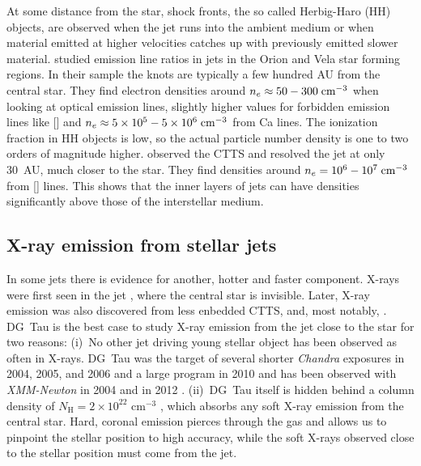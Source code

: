 \documentclass{emulateapj}
\begin{document}
At some distance from the star, shock fronts, the so called Herbig-Haro (HH) objects, are observed when the jet runs into the ambient medium or when material emitted at higher velocities catches up with previously emitted slower material. \citet{2006A&A...456..189P} studied emission line ratios in jets in the Orion and Vela star forming regions. In their sample the knots are typically a few hundred AU from the central star. They find electron densities around $n_e \approx 50-300 \textrm{\;cm}^{-3}$ when looking at optical emission lines, slightly higher values for forbidden emission lines like [] and $n_e \approx 5\times10^5-5\times10^6 \textrm{\;cm}^{-3}$ from Ca lines. The ionization fraction in HH objects is low, so the actual particle number density is one to two orders of magnitude higher. \citet{2004ApJ...609..261H} observed the CTTS  and resolved the jet at only 30~AU, much closer to the star. They find densities around $n_e=10^6-10^7\textrm{\;cm}^{-3}$ from [] lines. This shows that the inner layers of jets can have densities significantly above those of the interstellar medium.

\subsection{X-ray emission from stellar jets}
\label{sect:introxray}
In some jets there is evidence for another, hotter and faster component. X-rays were first seen in the jet  \citep{2001Natur.413..708P,2012A&A...542A.123S}, where the central star is invisible. Later, X-ray emission was also discovered from less enbedded CTTS,  \citep{2014ApJ...788..101S} and, most notably, . DG~Tau is the best case to study X-ray emission from the jet close to the star for two reasons: (i)~No other jet driving young stellar object has been observed as often in X-rays. DG~Tau was the target of several shorter \emph{Chandra} exposures in 2004, 2005, and 2006 and a large program in 2010 \citep{2005ApJ...626L..53G,2008A&A...478..797G,2011ASPC..448..617G} and has been observed with \emph{XMM-Newton} in 2004 \citep{2007A&A...468..353G} and in 2012 \citep{SchneiderDGTauXray}. (ii)~DG~Tau itself is hidden behind a column density of $N_{\textrm{H}}=2\times10^{22}\textrm{ cm}^{-3}$ \citep{2008A&A...478..797G}, which absorbs any soft X-ray emission from the central star. Hard, coronal emission pierces through the gas and allows us to pinpoint the stellar position to high accuracy, while the soft X-rays observed close to the stellar position must come from the jet.
\end{document}

